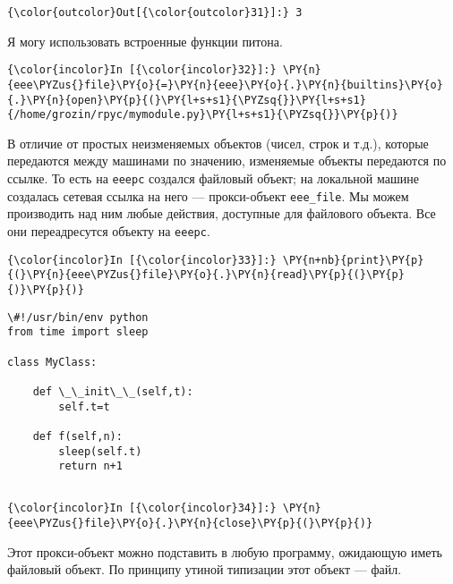 \begin{Verbatim}[commandchars=\\\{\}]
{\color{outcolor}Out[{\color{outcolor}31}]:} 3
\end{Verbatim}
            
    Я могу использовать встроенные функции питона.

    \begin{Verbatim}[commandchars=\\\{\}]
{\color{incolor}In [{\color{incolor}32}]:} \PY{n}{eee\PYZus{}file}\PY{o}{=}\PY{n}{eee}\PY{o}{.}\PY{n}{builtins}\PY{o}{.}\PY{n}{open}\PY{p}{(}\PY{l+s+s1}{\PYZsq{}}\PY{l+s+s1}{/home/grozin/rpyc/mymodule.py}\PY{l+s+s1}{\PYZsq{}}\PY{p}{)}
\end{Verbatim}


    В отличие от простых неизменяемых объектов (чисел, строк и т.д.),
которые передаются между машинами по значению, изменяемые объекты
передаются по ссылке. То есть на \texttt{eeepc} создался файловый
объект; на локальной машине создалась сетевая ссылка на него ---
прокси-объект \texttt{eee\_file}. Мы можем производить над ним любые
действия, доступные для файлового объекта. Все они переадресутся объекту
на \texttt{eeepc}.

    \begin{Verbatim}[commandchars=\\\{\}]
{\color{incolor}In [{\color{incolor}33}]:} \PY{n+nb}{print}\PY{p}{(}\PY{n}{eee\PYZus{}file}\PY{o}{.}\PY{n}{read}\PY{p}{(}\PY{p}{)}\PY{p}{)}
\end{Verbatim}


    \begin{Verbatim}[commandchars=\\\{\}]
\#!/usr/bin/env python
from time import sleep

class MyClass:

    def \_\_init\_\_(self,t):
        self.t=t

    def f(self,n):
        sleep(self.t)
        return n+1


    \end{Verbatim}

    \begin{Verbatim}[commandchars=\\\{\}]
{\color{incolor}In [{\color{incolor}34}]:} \PY{n}{eee\PYZus{}file}\PY{o}{.}\PY{n}{close}\PY{p}{(}\PY{p}{)}
\end{Verbatim}


    Этот прокси-объект можно подставить в любую программу, ожидающую иметь
файловый объект. По принципу утиной типизации этот объект --- файл.

